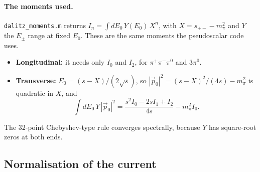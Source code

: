 \documentclass{article}
\newcommand{\spm}{s_{+-}}
\newcommand{\mpi}{m_\pi}
\begin{document}
\paragraph{The moments used.}
\texttt{dalitz\_moments.m} returns $I_n=\int dE_0\,Y(E_0)\,X^n$, with $X=\spm-\mpi^2$ and $Y$
the $E_\pm$ range at fixed $E_0$. These are the same moments the pseudoscalar code uses.
\begin{itemize}
\item \textbf{Longitudinal:} it needs only $I_0$ and $I_2$, for $\pi^+\pi^-\pi^0$ and $3\pi^0$.
\item \textbf{Transverse:} $E_0=(s-X)/(2\sqrt s)$, so
  $|\vec p_0|^2=(s-X)^2/(4s)-\mpi^2$ is quadratic in $X$, and
  \begin{equation}
    \int\!dE_0\,Y\,|\vec p_0|^2=\frac{s^2I_0-2sI_1+I_2}{4s}-\mpi^2I_0 .
  \end{equation}
\end{itemize}
The 32-point Chebyshev-type rule converges spectrally, because $Y$ has square-root zeros at both
ends.

\subsection{Normalisation of the current}
\end{document}
